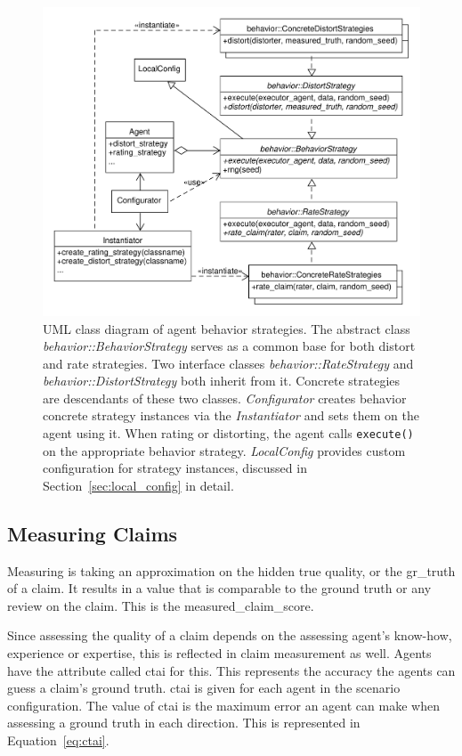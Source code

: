 \documentclass[%
    ]{\PathToTumTemplate/thesis/tum_thesis}
\begin{document}
\begin{figure}[tbp]
  \begin{center}
        \includegraphics[width=1\linewidth]	{../uml/behavior_strategies.pdf}
    \caption{
	UML class diagram of agent behavior strategies.
	The abstract class \emph{behavior::BehaviorStrategy} serves as a common base for both distort and rate strategies.
	Two interface classes \emph{behavior::RateStrategy} and \emph{behavior::DistortStrategy} both inherit from it.
	Concrete strategies are descendants of these two classes.
	\emph{Configurator} creates behavior concrete strategy instances via the \emph{Instantiator} and sets them on the agent using it.
	When rating or distorting, the agent calls \lstinline{execute()} on the appropriate behavior strategy.
	\emph{LocalConfig} provides custom configuration for strategy instances, discussed in Section~\ref{sec:local_config} in detail.
    }
    \label{fig:behavior_strategies}
  \end{center}
\end{figure}


\subsection{Measuring Claims}
Measuring is taking an approximation on the hidden true quality, or the \gls{gr_truth} of a claim.
It results in a value that is comparable to the ground truth or any review on the claim.
This is the \gls{measured_claim_score}.

Since assessing the quality of a claim depends on the assessing agent's know-how, experience or expertise, this is reflected in claim measurement as well.
Agents have the attribute called \gls{ctai} for this.
This represents the accuracy the agents can guess a claim's ground truth.
\Gls{ctai} is given for each agent in the scenario configuration.
The value of \gls{ctai} is the maximum error an agent can make when assessing a ground truth in each direction.
This is represented in Equation~\ref{eq:ctai}.
\end{document}
